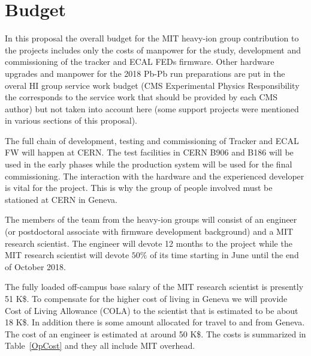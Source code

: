 \section{Budget}
\label{sec:funding}

In this proposal the overall budget for the MIT heavy-ion group contribution to the projects includes only the costs of manpower for the study, development and commissioning of the tracker and ECAL FEDs firmware. Other hardware upgrades and manpower for the 2018 Pb-Pb run preparations are put in the overal HI group service work budget (CMS Experimental Physics Responsibility the corresponds to the service work that should be provided by each CMS author)  but not taken into account here (some support projects were mentioned in various sections of this proposal).

The full chain of development, testing and commissioning of Tracker and ECAL FW will happen at CERN. The test facilities in CERN B906 and B186 will be used in the early phases while the production system will be used for the final commissioning. The interaction with the hardware and the experienced developer is vital for the project. This is why the group of people involved must be stationed at CERN in Geneva.

The members of the team from the heavy-ion groups will consist of an engineer (or postdoctoral associate with firmware development background)  and a MIT research scientist. The engineer will devote 12 months to the project while the MIT research scientist will devote $50\%$ of its time starting in June until the end of October 2018. 
 

The fully loaded off-campus base salary of the MIT research scientist is presently 51 K\$. To compensate for the higher cost of living in Geneva we will provide Cost of Living Allowance (COLA) to the scientist that is estimated to be about 18 K\$. In addition there is some amount allocated for travel to and from Geneva. The cost of an engineer is estimated at around 50 K\$. The costs is summarized in Table~\ref{OpCost} and they all include MIT overhead. 


